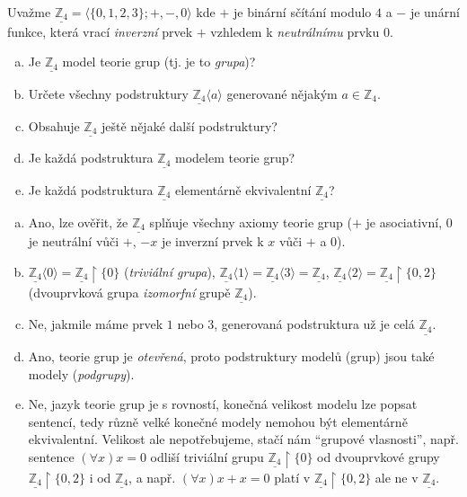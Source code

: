 \begin{problem}

    Uvažme $\underline{\mathbb Z_4}=\langle\{0,1,2,3\};+,-,0 \rangle$ kde $+$ je binární sčítání modulo $4$ a $-$ je unární funkce, která vrací \emph{inverzní} prvek $+$ vzhledem k \emph{neutrálnímu} prvku $0$.
    \begin{enumerate}[(a)]      
        \item Je $\underline{\mathbb Z_4}$ model teorie grup (tj. je to \emph{grupa})?
        \item Určete všechny podstruktury $\underline{\mathbb Z_4}\langle a\rangle$ generované nějakým $a\in \mathbb Z_4$.
        \item Obsahuje $\underline{\mathbb Z_4}$ ještě nějaké další podstruktury?
        \item Je každá podstruktura $\underline{\mathbb Z_4}$ modelem teorie grup?
        \item Je každá podstruktura $\underline{\mathbb Z_4}$ elementárně ekvivalentní $\underline{\mathbb Z_4}$?
    \end{enumerate}

    \begin{solution}

        \begin{enumerate}[(a)]
            \item Ano, lze ověřit, že $\underline{\mathbb Z_4}$ splňuje všechny axiomy teorie grup ($+$ je asociativní, $0$ je neutrální vůči $+$, $-x$ je inverzní prvek k $x$ vůči $+$ a $0$).
            \item $\underline{\mathbb Z_4}\langle 0\rangle=\underline{\mathbb Z_4}\restriction\{0\}$ (\emph{triviální grupa}), $\underline{\mathbb Z_4}\langle 1\rangle=\underline{\mathbb Z_4}\langle 3\rangle=\underline{\mathbb Z_4}$, $\underline{\mathbb Z_4}\langle 2\rangle=\underline{\mathbb Z_4}\restriction\{0,2\}$ (dvouprvková grupa \emph{izomorfní} grupě $\underline{\mathbb Z_4}$).
            \item Ne, jakmile máme prvek $1$ nebo $3$, generovaná podstruktura už je celá $\underline{\mathbb Z_4}$.
            \item Ano, teorie grup je \emph{otevřená}, proto podstruktury modelů (grup) jsou také modely (\emph{podgrupy}).
            \item Ne, jazyk teorie grup je s rovností, konečná velikost modelu lze popsat sentencí, tedy různě velké konečné modely nemohou být elementárně ekvivalentní. Velikost ale nepotřebujeme, stačí nám ``grupové vlasnosti'', např. sentence $(\forall x)x=0$ odliší triviální grupu $\underline{\mathbb Z_4}\restriction\{0\}$ od dvouprvkové grupy $\underline{\mathbb Z_4}\restriction\{0,2\}$ i od $\underline{\mathbb Z_4}$, a např. $(\forall x)x+x=0$ platí v $\underline{\mathbb Z_4}\restriction\{0,2\}$ ale ne v $\underline{\mathbb Z_4}$.
        \end{enumerate}
                    
    \end{solution}

\end{problem}


